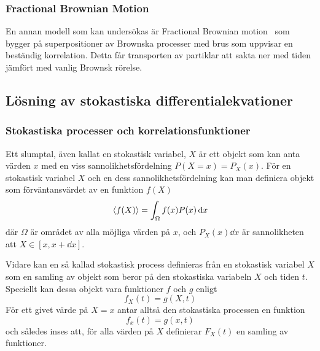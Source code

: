 
\subsubsection{Fractional Brownian Motion}

En annan modell som kan undersökas är Fractional Brownian motion~\cite{Hofling&Franosch2013} som bygger på superpositioner av Brownska processer med brus som uppvisar en beständig korrelation. Detta får transporten av partiklar att sakta ner med tiden jämfört med vanlig Brownsk rörelse.


\subsection{Lösning av stokastiska differentialekvationer}

\subsubsection{Stokastiska processer och korrelationsfunktioner}
Ett slumptal, även kallat en stokastisk variabel, $X$ är ett objekt som kan anta värden $x$ med en viss sannolikhetsfördelning $P(X=x)=P_X(x)$. För en stokastisk variabel $X$ och en dess sannolikhetsfördelning kan man definiera objekt som förväntansvärdet av en funktion $f(X)$
\begin{equation}
    \ev{f(X)} = \int_{\Omega} f(x)P(x) \id{x}
\end{equation}
där $\Omega$ är området av alla möjliga värden på $x$, och $P_X(x)\dd{x}$ är sannolikheten att $X\in[x,x+\dd{x}]$. 

Vidare kan en så kallad stokastisk process definieras från en stokastisk variabel $X$ som en samling av objekt som beror på den stokastiska variabeln $X$ och tiden $t$\footnotemark. Speciellt kan dessa objekt vara funktioner $f$ och $g$ enligt 
\begin{equation}
    f_X(t) = g(X,t)
\end{equation}
För ett givet värde på $X=x$ antar alltså den stokastiska processen en funktion
\begin{equation}
    f_x(t) = g(x,t)
\end{equation}
och således inses att, för alla värden på $X$ definierar $F_X(t)$ en
samling av funktioner. 

